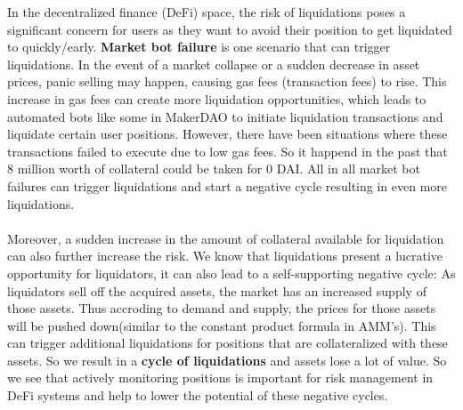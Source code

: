 \documentclass{article}
\begin{document}
In the decentralized finance (DeFi) space, the risk of liquidations poses a significant concern for users as they want to avoid their position to get liquidated to quickly/early. \textbf{Market bot failure} is one scenario that can trigger liquidations. In the event of a market collapse or a sudden decrease in asset prices, panic selling may happen, causing gas fees (transaction fees) to rise. This increase in gas fees can create more liquidation opportunities, which leads to automated bots like some in MakerDAO to initiate liquidation transactions and liquidate certain user positions. However, there have been situations where these transactions failed to execute due to low gas fees. So it happend in the past that 8 million worth of collateral could be taken for 0 DAI.  All in all market bot failures can trigger liquidations and start a negative cycle resulting in even more liquidations. \\\\Moreover, a sudden increase in the amount of collateral available for liquidation can also further increase the risk. We know that liquidations present a lucrative opportunity for liquidators, it can also lead to a self-supporting negative cycle:  As liquidators sell off the acquired assets, the market has an increased supply of those assets. Thus accroding to demand and supply, the prices for those assets will be pushed down(similar to the constant product formula in AMM's). This can trigger additional liquidations for positions that are collateralized with these assets. So we result in a  \textbf{cycle of liquidations} and assets lose a lot of value. So we see that actively monitoring positions is important for risk management in DeFi systems and help to lower the potential of these negative cycles.
\end{document}
